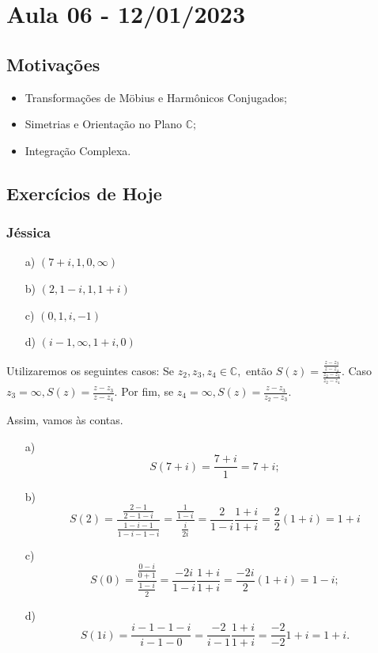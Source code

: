 \documentclass[complex.tex]{subfiles}
\begin{document}
\section{Aula 06 - 12/01/2023}
\subsection{Motivações}
\begin{itemize}
	\item Transformações de M\"{o}bius e Harm\^onicos Conjugados;
	\item Simetrias e Orientação no Plano $\mathbb{C};$
	\item Integração Complexa.
\end{itemize}
\subsection{Exercícios de Hoje }
\subsubsection{Jéssica}
\begin{itemize}
	\item[a)] $(7+i, 1, 0, \infty)$
	\item[b)] $(2, 1-i, 1, 1+i)$
	\item[c)] $(0, 1, i, -1)$
	\item[d)] $(i-1, \infty, 1+i, 0)$
\end{itemize}
Utilizaremos os seguintes casos: Se $z_{2}, z_{3}, z_{4}\in \mathbb{C},$ então $S(z) = \displaystyle \frac{\frac{z-z_{3}}{z-z_{4}}}{\frac{z_{2} - z_{3}}{z_{2} - z_{4}}}.$
Caso $z_{3} = \infty, \displaystyle S(z) = \frac{z - z_{3}}{z - z_{4}}.$ Por fim, se $z_{4} = \infty, S(z) = \displaystyle \frac{z - z_{3}}{z_{2} - z_{3}}.$

Assim, vamos às contas.
\begin{itemize}
	\item[a)] $$S(7 + i) = \frac{7 + i}{1} = 7 + i;$$
	\item[b)] $$S(2) = \frac{\frac{2 -1}{2 - 1 - i}}{\frac{1 - i - 1}{1 - i - 1 - i}} = \frac{\frac{1}{1-i}}{\frac{i}{2i}} = \frac{2}{1-i}\frac{1+i}{1+i} = \frac{2}{2}(1 + i) = 1 + i$$
	\item[c)] $$S(0) = \frac{\frac{0-i}{0+1}}{\frac{1-i}{2}} = \frac{-2i}{1-i}\frac{1+i}{1+i} = \frac{-2i}{2}(1+i) = 1-i;$$
	\item[d)] $$S(1i) = \frac{i-1-1-i}{i-1-0} = \frac{-2}{i-1}\frac{1+i}{1+i} = \frac{-2}{-2}1+i = 1+i.$$
\end{itemize}
\end{document}
